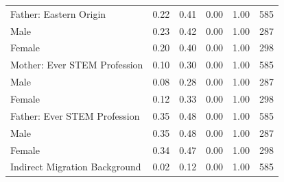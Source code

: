 \documentclass[a4paper, oneside, hyperfootnotes = false]{article}
\begin{document}
{\begin{table}[ht]
\begin{center}
{\begin{tabular}{llllll}
			\multicolumn{1}{l}{Father: Eastern Origin} &
			\multicolumn{1}{r}{0.22} &
			\multicolumn{1}{r}{0.41} &
			\multicolumn{1}{r}{0.00} &
			\multicolumn{1}{r}{1.00} &
			\multicolumn{1}{r}{585} \\
			\multicolumn{1}{l}{\hspace{1em}Male} &
			\multicolumn{1}{r}{0.23} &
			\multicolumn{1}{r}{0.42} &
			\multicolumn{1}{r}{0.00} &
			\multicolumn{1}{r}{1.00} &
			\multicolumn{1}{r}{287} \\
			\multicolumn{1}{l}{\hspace{1em}Female} &
			\multicolumn{1}{r}{0.20} &
			\multicolumn{1}{r}{0.40} &
			\multicolumn{1}{r}{0.00} &
			\multicolumn{1}{r}{1.00} &
			\multicolumn{1}{r}{298} \\
			\multicolumn{1}{l}{Mother: Ever STEM Profession} &
			\multicolumn{1}{r}{0.10} &
			\multicolumn{1}{r}{0.30} &
			\multicolumn{1}{r}{0.00} &
			\multicolumn{1}{r}{1.00} &
			\multicolumn{1}{r}{585} \\
			\multicolumn{1}{l}{\hspace{1em}Male} &
			\multicolumn{1}{r}{0.08} &
			\multicolumn{1}{r}{0.28} &
			\multicolumn{1}{r}{0.00} &
			\multicolumn{1}{r}{1.00} &
			\multicolumn{1}{r}{287} \\
			\multicolumn{1}{l}{\hspace{1em}Female} &
			\multicolumn{1}{r}{0.12} &
			\multicolumn{1}{r}{0.33} &
			\multicolumn{1}{r}{0.00} &
			\multicolumn{1}{r}{1.00} &
			\multicolumn{1}{r}{298} \\
			\multicolumn{1}{l}{Father: Ever STEM Profession} &
			\multicolumn{1}{r}{0.35} &
			\multicolumn{1}{r}{0.48} &
			\multicolumn{1}{r}{0.00} &
			\multicolumn{1}{r}{1.00} &
			\multicolumn{1}{r}{585} \\
			\multicolumn{1}{l}{\hspace{1em}Male} &
			\multicolumn{1}{r}{0.35} &
			\multicolumn{1}{r}{0.48} &
			\multicolumn{1}{r}{0.00} &
			\multicolumn{1}{r}{1.00} &
			\multicolumn{1}{r}{287} \\
			\multicolumn{1}{l}{\hspace{1em}Female} &
			\multicolumn{1}{r}{0.34} &
			\multicolumn{1}{r}{0.47} &
			\multicolumn{1}{r}{0.00} &
			\multicolumn{1}{r}{1.00} &
			\multicolumn{1}{r}{298} \\
			\multicolumn{1}{l}{Indirect Migration Background} &
			\multicolumn{1}{r}{0.02} &
			\multicolumn{1}{r}{0.12} &
			\multicolumn{1}{r}{0.00} &
			\multicolumn{1}{r}{1.00} &
			\multicolumn{1}{r}{585} \\

\end{tabular}}
\end{center}
\end{table}}
\end{document}
